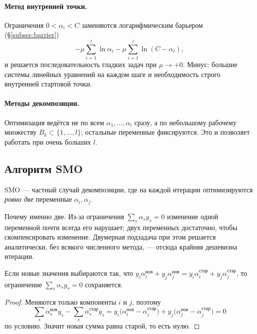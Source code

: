 \paragraph{Метод внутренней точки.}
Ограничения $0 < \alpha_i < C$ заменяются логарифмическим барьером
(\S\ref{subsec:barrier})
\[
  -\mu\sum_{i=1}^{l}\ln\alpha_i - \mu\sum_{i=1}^{l}\ln(C - \alpha_i) ,
\]
и решается последовательность гладких задач при $\mu \to +0$. Минус: большие
системы линейных уравнений на каждом шаге и необходимость строго внутренней
стартовой точки.

\paragraph{Методы декомпозиции.}
Оптимизация ведётся не по всем $\alpha_1,\dots,\alpha_l$ сразу, а по небольшому
рабочему множеству $B_k \subset \{1,\dots,l\}$; остальные переменные
фиксируются. Это и позволяет работать при очень больших $l$.

\subsection{Алгоритм SMO}
\label{subsec:smo}

SMO — частный случай декомпозиции, где на каждой итерации оптимизируются
\emph{ровно две} переменные $\alpha_i, \alpha_j$.

\begin{idea}
Почему именно две. Из-за ограничения $\sum_s \alpha_s y_s = 0$ изменение одной
переменной почти всегда его нарушает; двух переменных достаточно, чтобы
скомпенсировать изменение. Двумерная подзадача при этом решается аналитически,
без всякого численного метода, — отсюда крайняя дешевизна итерации.
\end{idea}

\begin{theorem}\label{thm:smo-eq}
Если новые значения выбираются так, что
$y_i\alpha_i^{\text{нов}} + y_j\alpha_j^{\text{нов}}
 = y_i\alpha_i^{\text{стар}} + y_j\alpha_j^{\text{стар}}$,
то ограничение $\sum_s \alpha_s y_s = 0$ сохраняется.
\end{theorem}

\begin{proof}
Меняются только компоненты $i$ и $j$, поэтому
\[
  \sum_s \alpha_s^{\text{нов}} y_s - \sum_s \alpha_s^{\text{стар}} y_s
  = y_i\big(\alpha_i^{\text{нов}} - \alpha_i^{\text{стар}}\big)
  + y_j\big(\alpha_j^{\text{нов}} - \alpha_j^{\text{стар}}\big) = 0
\]
по условию. Значит новая сумма равна старой, то есть нулю.
\end{proof}

